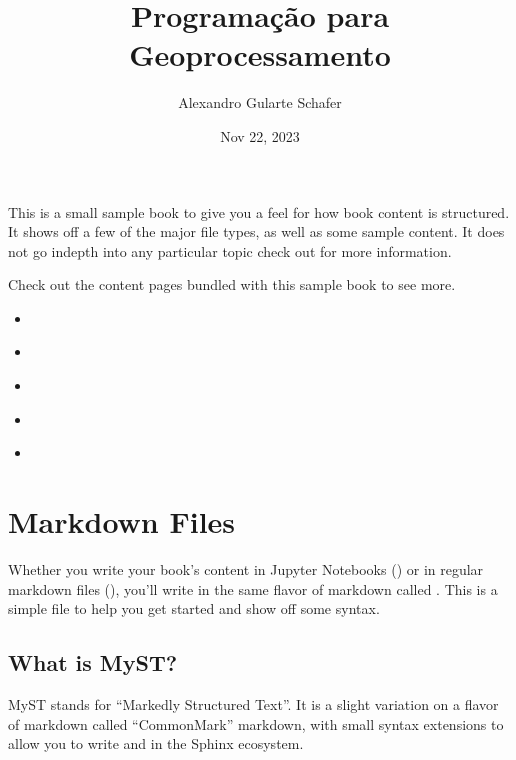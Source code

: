 \documentclass[letterpaper,10pt,english]{jupyterBook}
\title{Programação para Geoprocessamento}
\date{Nov 22, 2023}
\author{Alexandro Gularte Schafer}
\begin{document}
\pagestyle{empty}
\sphinxmaketitle
\pagestyle{plain}
\sphinxtableofcontents
\pagestyle{normal}
\label{\detokenize{intro::doc}}


\sphinxAtStartPar
This is a small sample book to give you a feel for how book content is
structured.
It shows off a few of the major file types, as well as some sample content.
It does not go in\sphinxhyphen{}depth into any particular topic \sphinxhyphen{} check out  for more information.

\sphinxAtStartPar
Check out the content pages bundled with this sample book to see more.
\begin{itemize}
\item {} 
\sphinxAtStartPar
{\hyperref[\detokenize{markdown::doc}]{}}

\item {} 
\sphinxAtStartPar
{\hyperref[\detokenize{notebooks::doc}]{}}

\item {} 
\sphinxAtStartPar
{\hyperref[\detokenize{markdown-notebooks::doc}]{}}

\item {} 
\sphinxAtStartPar
{\hyperref[\detokenize{introducao::doc}]{}}

\item {} 
\sphinxAtStartPar
{\hyperref[\detokenize{capitulo2::doc}]{}}

\end{itemize}

\sphinxstepscope


\chapter{Markdown Files}
\label{\detokenize{markdown:markdown-files}}\label{\detokenize{markdown::doc}}
\sphinxAtStartPar
Whether you write your book’s content in Jupyter Notebooks () or
in regular markdown files (), you’ll write in the same flavor of markdown
called .
This is a simple file to help you get started and show off some syntax.


\section{What is MyST?}
\label{\detokenize{markdown:what-is-myst}}
\sphinxAtStartPar
MyST stands for “Markedly Structured Text”. It
is a slight variation on a flavor of markdown called “CommonMark” markdown,
with small syntax extensions to allow you to write  and 
in the Sphinx ecosystem.
\end{document}
